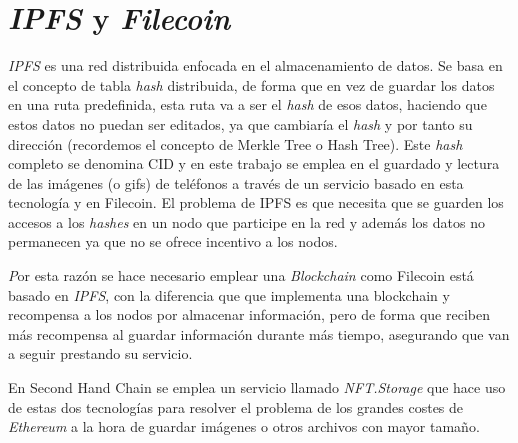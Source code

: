  \section{\textit{IPFS} y \textit{Filecoin}}

 \textit{IPFS}\cite{ipfsWhatIPFS} es una red distribuida enfocada en el almacenamiento de datos. Se basa en el concepto de tabla \textit{hash} distribuida, de forma que en vez de guardar los datos en una ruta predefinida, esta ruta va a ser el \textit{hash} de esos datos, haciendo que estos datos no puedan ser editados, ya que cambiaría el \textit{hash} y por tanto su dirección (recordemos el concepto de Merkle Tree o Hash Tree). Este \textit{hash} completo se denomina CID y en este trabajo se emplea en el guardado y lectura de las imágenes (o gifs) de teléfonos a través de un servicio basado en esta tecnología y en Filecoin. El problema de IPFS es que necesita que se guarden los accesos a los \textit{hashes} en un nodo que participe en la red y además los datos no permanecen ya que no se ofrece incentivo a los nodos.

 \textit Por esta razón se hace necesario emplear una \textit{Blockchain} como {Filecoin}\cite{filecoinOverview} está basado en \textit{IPFS}, con la diferencia que que implementa una blockchain y recompensa a los nodos por almacenar información, pero de forma que reciben más recompensa al guardar información durante más tiempo, asegurando que van a seguir prestando su servicio.

 En Second Hand Chain se emplea un servicio llamado \textit{NFT.Storage}\cite{nftNFTStorageFree} que hace uso de estas dos tecnologías para resolver el problema de los grandes costes de \textit{Ethereum} a la hora de guardar imágenes o otros archivos con mayor tamaño.